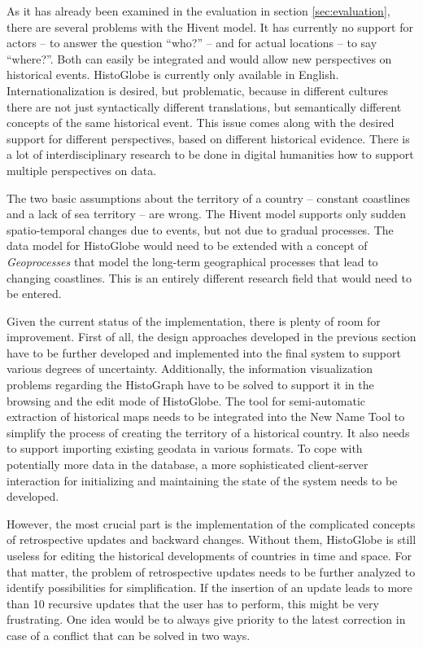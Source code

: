 As it has already been examined in the evaluation in section \ref{sec:evaluation}, there are several problems with the Hivent model. It has currently no support for actors -- to answer the question ``who?'' -- and for actual locations -- to say ``where?''. Both can easily be integrated and would allow new perspectives on historical events. HistoGlobe is currently only available in English. Internationalization is desired, but problematic, because in different cultures there are not just syntactically different translations, but semantically different concepts of the same historical event. This issue comes along with the desired support for different perspectives, based on different historical evidence. There is a lot of interdisciplinary research to be done in digital humanities how to support multiple perspectives on data.

The two basic assumptions about the territory of a country -- constant coastlines and a lack of sea territory -- are wrong. The Hivent model supports only sudden spatio-temporal changes due to events, but not due to gradual processes. The data model for HistoGlobe would need to be extended with a concept of \emph{Geoprocesses} that model the long-term geographical processes that lead to changing coastlines. This is an entirely different research field that would need to be entered.

Given the current status of the implementation, there is plenty of room for improvement. First of all, the design approaches developed in the previous section have to be further developed and implemented into the final system to support various degrees of uncertainty. Additionally, the information visualization problems regarding the HistoGraph have to be solved to support it in the browsing and the edit mode of HistoGlobe. The tool for semi-automatic extraction of historical maps needs to be integrated into the New Name Tool to simplify the process of creating the territory of a historical country. It also needs to support importing existing geodata in various formats. To cope with potentially more data in the database, a more sophisticated client-server interaction for initializing and maintaining the state of the system needs to be developed.

However, the most crucial part is the implementation of the complicated concepts of retrospective updates and backward changes. Without them, HistoGlobe is still useless for editing the historical developments of countries in time and space. For that matter, the problem of retrospective updates needs to be further analyzed to identify possibilities for simplification. If the insertion of an update leads to more than 10 recursive updates that the user has to perform, this might be very frustrating. One idea would be to always give priority to the latest correction in case of a conflict that can be solved in two ways.

